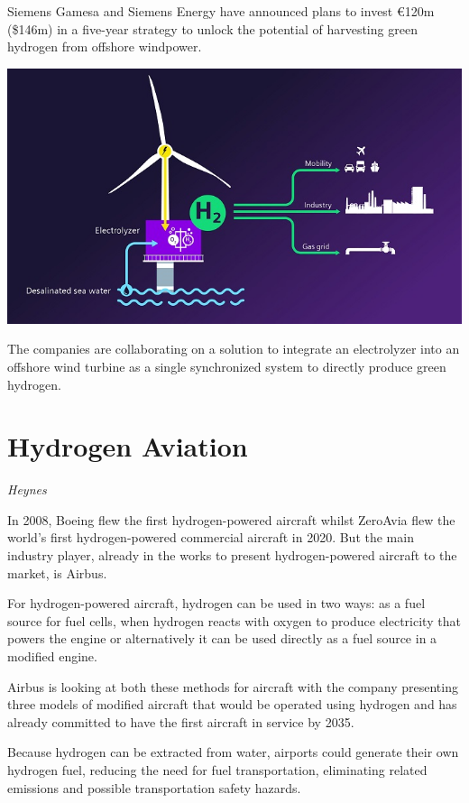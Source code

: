 \documentclass[
]{book}
\begin{document}
Siemens Gamesa and Siemens Energy have announced plans to invest €120m (\$146m)
in a five-year strategy to unlock the potential of
harvesting green hydrogen from offshore windpower.

\includegraphics{fig/Hydrogen_Offshore-Electrolysis_Siemens.jpg}

The companies are collaborating on a solution to integrate
an electrolyzer into an offshore wind turbine
as a single synchronized system to directly produce green hydrogen.

\hypertarget{hydrogen-aviation}{%
\section{Hydrogen Aviation}\label{hydrogen-aviation}}

\emph{Heynes}

In 2008, Boeing flew the first hydrogen-powered aircraft whilst ZeroAvia flew the world's first hydrogen-powered commercial aircraft in 2020. But the main industry player, already in the works to present hydrogen-powered aircraft to the market, is Airbus.

For hydrogen-powered aircraft, hydrogen can be used in two ways: as a fuel source for fuel cells, when hydrogen reacts with oxygen to produce electricity that powers the engine or alternatively it can be used directly as a fuel source in a modified engine.

Airbus is looking at both these methods for aircraft with the company presenting three models of modified aircraft that would be operated using hydrogen and has already committed to have the first aircraft in service by 2035.

Because hydrogen can be extracted from water, airports could generate their own hydrogen fuel, reducing the need for fuel transportation, eliminating related emissions and possible transportation safety hazards.
\end{document}
